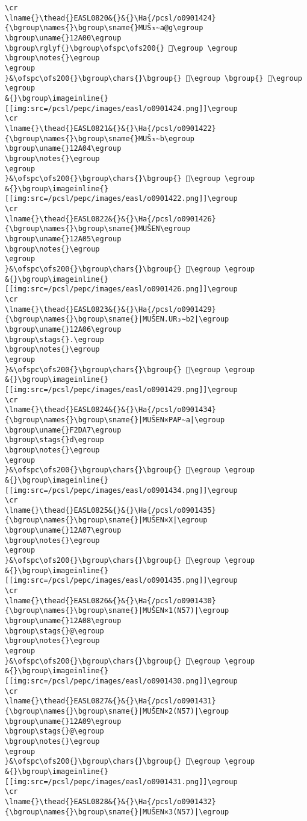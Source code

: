 \begin{verbatim}
\cr
\lname{}\thead{}EASL0820&{}&{}\Ha{/pcsl/o0901424}{\bgroup\names{}\bgroup\sname{}MUŠ₃∼a@g\egroup
\bgroup\uname{}12A00\egroup
\bgroup\rglyf{}\bgroup\ofspc\ofs200{} 𒨀\egroup \egroup
\bgroup\notes{}\egroup
\egroup
}&\ofspc\ofs200{}\bgroup\chars{}\bgroup{} 𒨀\egroup \bgroup{} 𒨁\egroup \egroup
&{}\bgroup\imageinline{}[[img:src=/pcsl/pepc/images/easl/o0901424.png]]\egroup
\cr
\lname{}\thead{}EASL0821&{}&{}\Ha{/pcsl/o0901422}{\bgroup\names{}\bgroup\sname{}MUŠ₃∼b\egroup
\bgroup\uname{}12A04\egroup
\bgroup\notes{}\egroup
\egroup
}&\ofspc\ofs200{}\bgroup\chars{}\bgroup{} 𒨄\egroup \egroup
&{}\bgroup\imageinline{}[[img:src=/pcsl/pepc/images/easl/o0901422.png]]\egroup
\cr
\lname{}\thead{}EASL0822&{}&{}\Ha{/pcsl/o0901426}{\bgroup\names{}\bgroup\sname{}MUŠEN\egroup
\bgroup\uname{}12A05\egroup
\bgroup\notes{}\egroup
\egroup
}&\ofspc\ofs200{}\bgroup\chars{}\bgroup{} 𒨅\egroup \egroup
&{}\bgroup\imageinline{}[[img:src=/pcsl/pepc/images/easl/o0901426.png]]\egroup
\cr
\lname{}\thead{}EASL0823&{}&{}\Ha{/pcsl/o0901429}{\bgroup\names{}\bgroup\sname{}|MUŠEN.UR₃∼b2|\egroup
\bgroup\uname{}12A06\egroup
\bgroup\stags{}.\egroup
\bgroup\notes{}\egroup
\egroup
}&\ofspc\ofs200{}\bgroup\chars{}\bgroup{} 𒨆\egroup \egroup
&{}\bgroup\imageinline{}[[img:src=/pcsl/pepc/images/easl/o0901429.png]]\egroup
\cr
\lname{}\thead{}EASL0824&{}&{}\Ha{/pcsl/o0901434}{\bgroup\names{}\bgroup\sname{}|MUŠEN×PAP∼a|\egroup
\bgroup\uname{}F2DA7\egroup
\bgroup\stags{}d\egroup
\bgroup\notes{}\egroup
\egroup
}&\ofspc\ofs200{}\bgroup\chars{}\bgroup{} 󲶧\egroup \egroup
&{}\bgroup\imageinline{}[[img:src=/pcsl/pepc/images/easl/o0901434.png]]\egroup
\cr
\lname{}\thead{}EASL0825&{}&{}\Ha{/pcsl/o0901435}{\bgroup\names{}\bgroup\sname{}|MUŠEN×X|\egroup
\bgroup\uname{}12A07\egroup
\bgroup\notes{}\egroup
\egroup
}&\ofspc\ofs200{}\bgroup\chars{}\bgroup{} 𒨇\egroup \egroup
&{}\bgroup\imageinline{}[[img:src=/pcsl/pepc/images/easl/o0901435.png]]\egroup
\cr
\lname{}\thead{}EASL0826&{}&{}\Ha{/pcsl/o0901430}{\bgroup\names{}\bgroup\sname{}|MUŠEN×1(N57)|\egroup
\bgroup\uname{}12A08\egroup
\bgroup\stags{}@\egroup
\bgroup\notes{}\egroup
\egroup
}&\ofspc\ofs200{}\bgroup\chars{}\bgroup{} 𒨈\egroup \egroup
&{}\bgroup\imageinline{}[[img:src=/pcsl/pepc/images/easl/o0901430.png]]\egroup
\cr
\lname{}\thead{}EASL0827&{}&{}\Ha{/pcsl/o0901431}{\bgroup\names{}\bgroup\sname{}|MUŠEN×2(N57)|\egroup
\bgroup\uname{}12A09\egroup
\bgroup\stags{}@\egroup
\bgroup\notes{}\egroup
\egroup
}&\ofspc\ofs200{}\bgroup\chars{}\bgroup{} 𒨉\egroup \egroup
&{}\bgroup\imageinline{}[[img:src=/pcsl/pepc/images/easl/o0901431.png]]\egroup
\cr
\lname{}\thead{}EASL0828&{}&{}\Ha{/pcsl/o0901432}{\bgroup\names{}\bgroup\sname{}|MUŠEN×3(N57)|\egroup

\end{verbatim}
